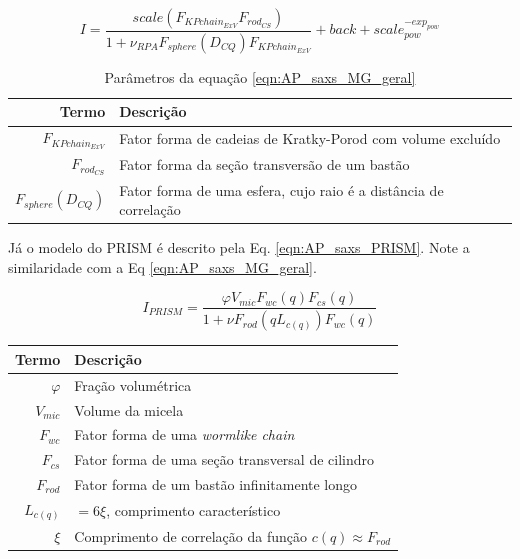 \begin{apendicesenv}
\begin{equation}
I = \frac{scale\left(F_{KPchain_{ExV}}F_{rod_{CS}}\right)}{1 + \nu_{RPA} F_{sphere}\left( D_{CQ}\right) F_{KPchain_{ExV}}} + back + scale_{pow}^{-exp_{pow}}
\label{eqn:AP_saxs_MG_geral}
\end{equation}

\begin{table}
    \IBGEtab%
    {\caption{Parâmetros da equação \ref{eqn:AP_saxs_MG_geral}}
     \label{tab_ap:fatores_geral} }%
    {\begin{tabular}{r p{8cm}}
    \toprule
    Termo 			& Descrição        						\\
    \midrule
    \(F_{KPchain_{ExV}}\)  & Fator forma de cadeias de Kratky-Porod com volume excluído \\
    \(F_{rod_{CS}}\)		 & Fator forma da seção transversão de um bastão	\\
    \(F_{sphere}(D_{CQ})\) & Fator forma de uma esfera, cujo raio é a distância de correlação \\
    \bottomrule%
    \end{tabular}}
    {}%
\end{table}


Já o modelo do PRISM é descrito pela Eq. \ref{eqn:AP_saxs_PRISM}. Note a similaridade com a Eq \ref{eqn:AP_saxs_MG_geral}.

\begin{equation}
I_{PRISM}= \frac{\varphi V_{mic}F_{wc}(q)F_{cs}(q)}{1 + \nu F_{rod}(qL_{c(q)})F_{wc}(q)}
\label{eqn:AP_saxs_PRISM}
\end{equation}

\begin{table}
    {%
     \begin{tabular}{r p{8cm}}
     \toprule
     Termo 			& Descrição        						\\
     \midrule
     \(\varphi\)		& Fração volumétrica \\ %
     \(V_{mic}\)		& Volume da micela   \\
     \(F_{wc}\)		& Fator forma de uma \emph{wormlike chain} \\
     \(F_{cs}\)		& Fator forma de uma seção transversal de cilindro \\ %
     \(F_{rod}\)		& Fator forma de um bastão infinitamente longo \\
     \(L_{c(q)}\)		& \(=6\xi\), comprimento característico \\
     \(\xi\)			& Comprimento de correlação da função \(c(q) \approx F_{rod}\) \\
     \bottomrule
     \end{tabular}}%
     {}%
\end{table}



\end{apendicesenv}
